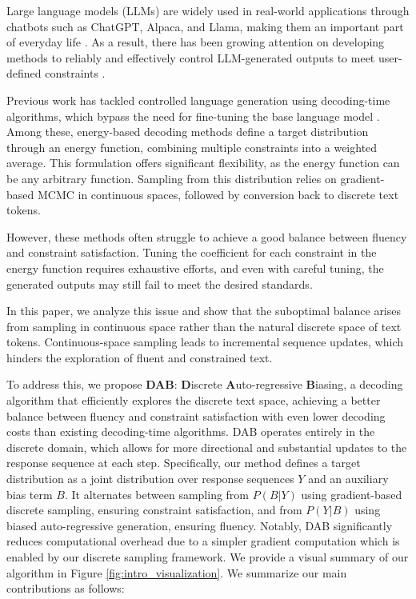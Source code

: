 Large language models (LLMs) are widely used in real-world applications through chatbots such as ChatGPT, Alpaca, and Llama, making them an important part of everyday life \citep{bender2021parrots, bommasani2021opportunities, weidinger2021ethical}. As a result, there has been growing attention on developing methods to reliably and effectively control LLM-generated outputs to meet user-defined constraints \citep{gehman2020realtoxicitypromptsevaluatingneuraltoxic,  dathathri2020plugplaylanguagemodels, goshvadi2023discs, han2023lm}. 

Previous work has tackled controlled language generation using decoding-time algorithms, which bypass the need for fine-tuning the base language model \citep{liu2023bolt, kumar2022gradient, mireshghallah-etal-2022-mix, dathathri2020plugplaylanguagemodels, qin2022cold}. Among these, energy-based decoding methods define a target distribution through an energy function, combining multiple constraints into a weighted average. This formulation offers significant flexibility, as the energy function can be any arbitrary function. Sampling from this distribution relies on gradient-based MCMC in continuous spaces, followed by conversion back to discrete text tokens.

However, these methods often struggle to achieve a good balance between fluency and constraint satisfaction. Tuning the coefficient for each constraint in the energy function requires exhaustive efforts, and even with careful tuning, the generated outputs may still fail to meet the desired standards.

In this paper, we analyze this issue and show that the suboptimal balance arises from sampling in continuous space rather than the natural discrete space of text tokens. Continuous-space sampling leads to incremental sequence updates, which hinders the exploration of fluent and constrained text.

To address this, we propose \textbf{DAB}: \textbf{D}iscrete \textbf{A}uto-regressive \textbf{B}iasing, a decoding algorithm that efficiently explores the discrete text space, achieving a better balance between fluency and constraint satisfaction with even lower decoding costs than existing decoding-time algorithms. DAB operates entirely in the discrete domain, which allows for more directional and substantial updates to the response sequence at each step. Specifically, our method defines a target distribution as a joint distribution over response sequences $Y$ and an auxiliary bias term $B$. It alternates between sampling from $P(B | Y)$ using gradient-based discrete sampling, ensuring constraint satisfaction, and from $P(Y | B)$ using biased auto-regressive generation, ensuring fluency. Notably, DAB significantly reduces computational overhead due to a simpler gradient computation which is enabled by our discrete sampling framework. We provide a visual summary of our algorithm in Figure \ref{fig:intro_visualization}.
We summarize our main contributions as follows: 

